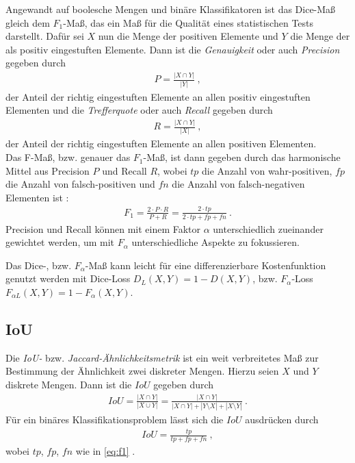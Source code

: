 Angewandt auf boolesche Mengen und binäre Klassifikatoren ist das Dice-Maß gleich dem $F_1$-Maß, das ein Maß für die Qualität eines statistischen Tests darstellt. Dafür sei $X$ nun die Menge der positiven Elemente und $Y$ die Menge der als positiv eingestuften Elemente. Dann ist die \textit{Genauigkeit} oder auch \textit{Precision} gegeben durch
\begin{align}
	\label{eq:precision} P = \frac{|X \cap Y|}{|Y|}~,
\end{align}
der Anteil der richtig eingestuften Elemente an allen positiv eingestuften Elementen und die \textit{Trefferquote} oder auch \textit{Recall} gegeben durch
\begin{align}
	\label{eq:recall} R = \frac{|X \cap Y|}{|X|}~,
\end{align}
der Anteil der richtig eingestuften Elemente an allen positiven Elementen. \\
Das F-Maß, bzw. genauer das $F_1$-Maß, ist dann gegeben durch das harmonische Mittel aus Precision $P$ und Recall $R$, wobei $tp$ die Anzahl von wahr-positiven, $fp$ die Anzahl von falsch-positiven und $fn$ die Anzahl von falsch-negativen Elementen ist \cite{YutakaSasaki.2007}:
\begin{align}
	\label{eq:f1} F_{1} = \frac{2\cdot P\cdot R}{P + R} = \frac{2\cdot tp}{2 \cdot tp + fp + fn}~.
\end{align}
Precision und Recall können mit einem Faktor $\alpha$ unterschiedlich zueinander gewichtet werden, um mit $F_{\alpha}$ unterschiedliche Aspekte zu fokussieren. 

Das Dice-, bzw. $F_{\alpha}$-Maß kann leicht für eine differenzierbare Kostenfunktion genutzt werden mit Dice-Loss $D_{L}(X, Y) = 1 - D(X,Y)$, bzw. $F_{\alpha}$-Loss $F_{\alpha L}(X,Y) = 1 - F_{\alpha}(X,Y)$. 


\subsection{\acf{IoU}}

Die \textit{\acf{IoU}-} bzw. \textit{Jaccard-Ähnlichkeitsmetrik} ist ein weit verbreitetes Maß zur Bestimmung der Ähnlichkeit zwei diskreter Mengen. Hierzu seien $X$ und $Y$ diskrete Mengen. Dann ist die $IoU$ gegeben durch 
\begin{align}
	\label{eq:iou} IoU = \frac{|X\cap Y|}{|X \cup Y|} = \frac{| X \cap Y |}{| X \cap Y | + |Y \setminus X| + |X \setminus Y|}~.
\end{align} 
Für ein binäres Klassifikationsproblem lässt sich die $IoU$ ausdrücken durch 
\begin{align}
	\label{eq:iou-binary} IoU = \frac{tp}{tp + fp + fn}~,
\end{align}
wobei $tp$, $fp$, $fn$ wie in \autoref{eq:f1} \cite{Fletcher.2018}. 

